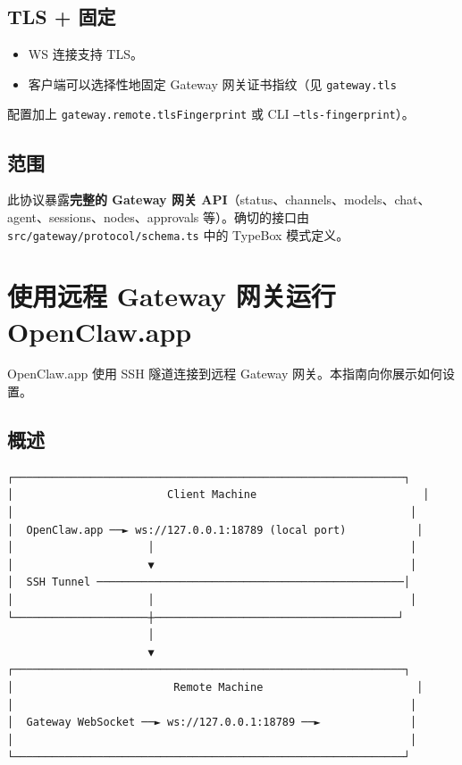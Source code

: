 \subsection{TLS + 固定}


\begin{itemize}
  \item WS 连接支持 TLS。
  \item 客户端可以选择性地固定 Gateway 网关证书指纹（见 \texttt{gateway.tls}
\end{itemize}

配置加上 \texttt{gateway.remote.tlsFingerprint} 或 CLI \texttt{--tls-fingerprint}）。

\subsection{范围}


此协议暴露\textbf{完整的 Gateway 网关 API}（status、channels、models、chat、
agent、sessions、nodes、approvals 等）。确切的接口由 \texttt{src/gateway/protocol/schema.ts} 中的 TypeBox 模式定义。


\clearpage

\section{使用远程 Gateway 网关运行 OpenClaw.app}


OpenClaw.app 使用 SSH 隧道连接到远程 Gateway 网关。本指南向你展示如何设置。

\subsection{概述}


\begin{lstlisting}
┌─────────────────────────────────────────────────────────────┐
│                        Client Machine                          │
│                                                              │
│  OpenClaw.app ──► ws://127.0.0.1:18789 (local port)           │
│                     │                                        │
│                     ▼                                        │
│  SSH Tunnel ────────────────────────────────────────────────│
│                     │                                        │
└─────────────────────┼──────────────────────────────────────┘
                      │
                      ▼
┌─────────────────────────────────────────────────────────────┐
│                         Remote Machine                        │
│                                                              │
│  Gateway WebSocket ──► ws://127.0.0.1:18789 ──►              │
│                                                              │
└─────────────────────────────────────────────────────────────┘
\end{lstlisting}



